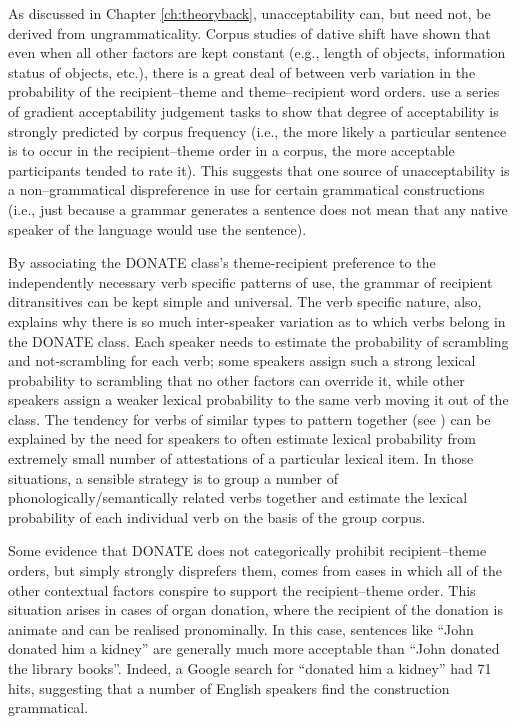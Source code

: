 As discussed in Chapter \ref{ch:theoryback}, unacceptability can, but need not, be derived from ungrammaticality. Corpus studies of dative shift \citep{Collins.1995,Bresnan.2007,Bresnan.2009} have shown that even when all other factors are kept constant (e.g., length of objects, information status of objects, etc.), there is a great deal of between verb variation in the probability of the recipient--theme and theme--recipient word orders. \cite{Bresnan.2010} use a series of gradient acceptability judgement tasks to show that degree of acceptability is strongly predicted by corpus frequency (i.e., the more likely a particular sentence is to occur in the recipient--theme order in a corpus, the more acceptable participants tended to rate it). This suggests that one source of unacceptability is a non--grammatical dispreference in use for certain grammatical constructions (i.e., just because a grammar generates a sentence does not mean that any native speaker of the language would use the sentence). 

By associating the DONATE class's theme-recipient preference to the independently necessary verb specific patterns of use, the grammar of recipient ditransitives can be kept simple and universal. The verb specific nature, also, explains why there is so much inter-speaker variation as to which verbs belong in the DONATE class. Each speaker needs to estimate the probability of scrambling and not-scrambling for each verb; some speakers assign such a strong lexical probability to scrambling that no other factors can override it, while other speakers assign a weaker lexical probability to the same verb moving it out of the class. The tendency for verbs of similar types to pattern together (see \citealt{Levin.1993}) can be explained by the need for speakers to often estimate lexical probability from extremely small number of attestations of a particular lexical item. In those situations, a sensible strategy is to group a number of phonologically/semantically related verbs together and estimate the lexical probability of each individual verb on the basis of the group corpus.

Some evidence that DONATE does not categorically prohibit recipient--theme orders, but simply strongly disprefers them, comes from cases in which all of the other contextual factors conspire to support the recipient--theme order. This situation arises in cases of organ donation, where the recipient of the donation is animate and can be realised pronominally. In this case, sentences like ``John donated him a kidney'' are generally much more acceptable than ``John donated the library books''. Indeed, a Google search for ``donated him a kidney'' had 71 hits, suggesting that a number of English speakers find the construction grammatical.

